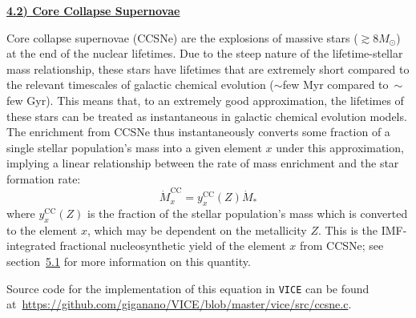 \documentclass{report}
\begin{document}
\newpage 
\noindent 
\begin{center} 
\hypertarget{enrichment:ccsne}{
	\underline{\LARGE
		\textbf{4.2) Core Collapse Supernovae} 
	}
}
\end{center}
\par\noindent 
Core collapse supernovae (CCSNe) are the explosions of massive stars 
($\gtrsim8M_\odot$) at the end of the nuclear lifetimes. Due to the steep 
nature of the lifetime-stellar mass relationship, these stars have lifetimes 
that are extremely short compared to the relevant timescales of galactic 
chemical evolution ($\sim$few Myr compared to~$\sim$few Gyr). This means that, 
to an extremely good approximation, the lifetimes of these stars can be 
treated as instantaneous in galactic chemical evolution models. The enrichment 
from CCSNe thus instantaneously converts some fraction of a single stellar 
population's mass into a given element $x$ under this approximation, implying 
a linear relationship between the rate of mass enrichment and the 
star formation rate: 
\begin{equation}
\dot{M}_x^\text{CC} = y_x^\text{CC}(Z)\dot{M}_* 
\end{equation}
where $y_x^\text{CC}(Z)$ is the fraction of the stellar population's mass 
which is converted to the element $x$, which may be dependent on the 
metallicity $Z$. This is the IMF-integrated fractional nucleosynthetic yield 
of the element $x$ from CCSNe; see section~\hyperlink{yields:ccsne}{5.1} for 
more information on this quantity. 
\par
Source code for the implementation of this equation in \texttt{VICE} can be 
found at~\url{https://github.com/giganano/VICE/blob/master/vice/src/ccsne.c}. 
\end{document}
